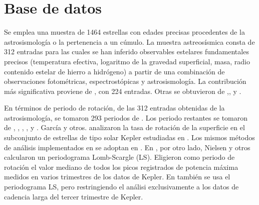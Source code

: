 \chapter{Base de datos}
\label{sec:data}

Se emplea una muestra de 1464 estrellas con edades precisas procedentes de la astrosismología o la pertenencia a un cúmulo. La muestra astreosísmica consta de 312 entradas para las cuales se han inferido observables estelares fundamentales precisos (temperatura efectiva, logaritmo de la gravedad superficial, masa, radio contenido estelar de hierro a hidrógeno) a partir de una combinación de observaciones fotométricas, espectrostópicas y astrosismología. La contribución más significativa proviene de \cite{Serenelli17}, con 224 entradas. Otras se obtuvieron de \cite{Ceillier16},\cite{Garcia14},\cite{Silva15} y \cite{Silva17}.

En términos de periodo de rotación, de las 312 entradas obtenidas de la astrosismología, se tomaron 293 periodos de \cite{Garcia14}. Los periodo restantes se tomaron de \cite{Ceillier16}, \cite{Mazeh15}, \cite{McQuillan13a}, \cite{McQuillan14}, \cite{Nielsen13} y \cite{Reinhold13}. García y otros. \cite{Garcia14} analizaron la tasa de rotación de la superficie en el subconjunto de estrellas de tipo solar Kepler estudiadas en \cite{Garcia14}. Los mismos métodos de análisis implementados en \cite{Garcia14} se adoptan en \cite{Ceillier16}. En \cite{Nielsen13}, por otro lado, Nielsen y otros calcularon un periodograma Lomb-Scargle (LS). Eligieron como periodo de rotación el valor mediano de todos los picos registrados de potencia máxima medidos en varios trimestres de los datos de Kepler. En \cite{Reinhold13} también se usa el periodograma LS, pero restringiendo el análisi exclusivamente a los datos de cadencia larga del tercer trimestre de Kepler.

